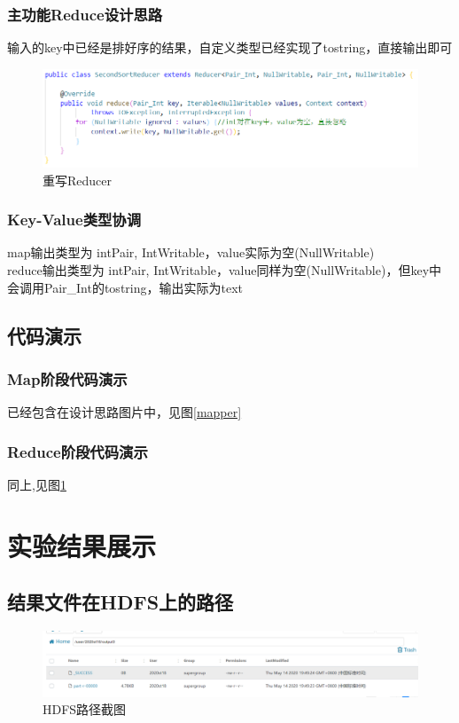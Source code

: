 \documentclass[a4paper,UTF8]{article}
\numberwithin{equation}{section}
\begin{document}
\subsubsection{主功能Reduce设计思路}
输入的key中已经是排好序的结果，自定义类型已经实现了tostring，直接输出即可
\begin{figure}[H]
    \centering

    \includegraphics[width = 15cm]{reduce1.png}

    \caption{重写Reducer}
    \label{reducer}
\end{figure}

\subsubsection{Key-Value类型协调}
map输出类型为 intPair, IntWritable，value实际为空(NullWritable) \\
reduce输出类型为 intPair, IntWritable，value同样为空(NullWritable)，但key中会调用Pair\_Int的tostring，输出实际为text
\subsection{代码演示}
\subsubsection{Map阶段代码演示}
已经包含在设计思路图片中，见图\ref{mapper}

\subsubsection{Reduce阶段代码演示}
同上,见图\ref{reducer}
\section{实验结果展示}

\subsection{结果文件在HDFS上的路径}
\begin{figure}[H]
    \centering

    \includegraphics[width = 15cm]{HDFS.png}

    \caption{HDFS路径截图}
\end{figure}
\end{document}
